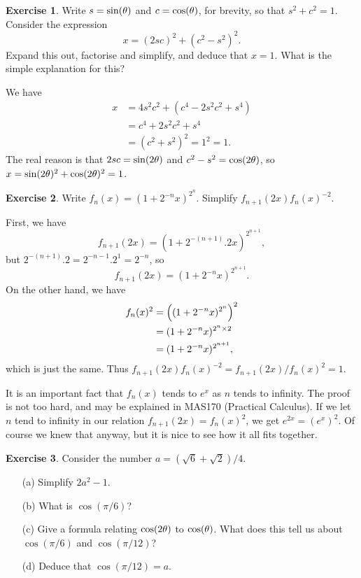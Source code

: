 \documentclass[a4paper]{amsart}
\theoremstyle{definition}
\newtheorem{exercise}{Exercise}[section]
\newenvironment{solution}{{\noindent \bf Solution:}}{}
\begin{document}
\begin{exercise}\label{ex-circ-sq}
Write $s=\sin(\theta)$ and $c=\cos(\theta)$, for brevity, so that
 $s^2+c^2=1$.  Consider the expression
 \[ x = (2sc)^2 + (c^2 - s^2)^2. \]
 Expand this out, factorise and simplify, and deduce that $x=1$.  What
 is the simple explanation for this?
\end{exercise}
\begin{solution}
We have
 \begin{align*}
  x &= 4s^2c^2 + (c^4 - 2s^2c^2 + s^4) \\
    &= c^4 + 2s^2c^2 + s^4 \\
    &= (c^2 + s^2)^2 = 1^2 = 1.
 \end{align*}
 The real reason is that $2sc=\sin(2\theta)$ and $c^2-s^2=\cos(2\theta)$,
 so $x=\sin(2\theta)^2+\cos(2\theta)^2=1$.
\end{solution}
\begin{exercise}\label{ex-exp-approx}
Write $f_n(x)=(1+2^{-n}x)^{2^n}$.  Simplify
 $f_{n+1}(2x)f_n(x)^{-2}$.
\end{exercise}
\begin{solution}
First, we have
 \[ f_{n+1}(2x)=(1+2^{-(n+1)}.2x)^{2^{n+1}}, \]
 but $2^{-(n+1)}.2=2^{-n-1}.2^1=2^{-n}$, so
 \[ f_{n+1}(2x)=(1+2^{-n}x)^{2^{n+1}}. \]
 On the other hand, we have
 \begin{align*}
  f_n(x)^2 &= \left((1+2^{-n}x)^{2^n}\right)^2 \\
           &= (1+2^{-n}x)^{2^n\times 2} \\
           &= (1+2^{-n}x)^{2^{n+1}},
 \end{align*}
 which is just the same.  Thus 
 $f_{n+1}(2x)f_n(x)^{-2}=f_{n+1}(2x)/f_n(x)^2=1$.

 It is an important fact that $f_n(x)$ tends to $e^x$ as $n$ tends to
 infinity.  The proof is not too hard, and may be explained in
 MAS170 (Practical Calculus).  If we let $n$ tend to infinity
 in our relation $f_{n+1}(2x)=f_n(x)^2$, we get $e^{2x}=(e^x)^2$.  Of
 course we knew that anyway, but it is nice to see how it all fits
 together.
\end{solution}
\begin{exercise}\label{ex-twelve}
Consider the number $a=(\sqrt{6}+\sqrt{2})/4$.
 \begin{itemize}
  \item[(a)] Simplify $2a^2-1$.
  \item[(b)] What is $\cos(\pi/6)$?
  \item[(c)] Give a formula relating $\cos(2\theta)$ to $\cos(\theta)$.  
   What does this tell us about $\cos(\pi/6)$ and $\cos(\pi/12)$? 
  \item[(d)] Deduce that $\cos(\pi/12)=a$.
 \end{itemize}
\end{exercise}
\end{document}
